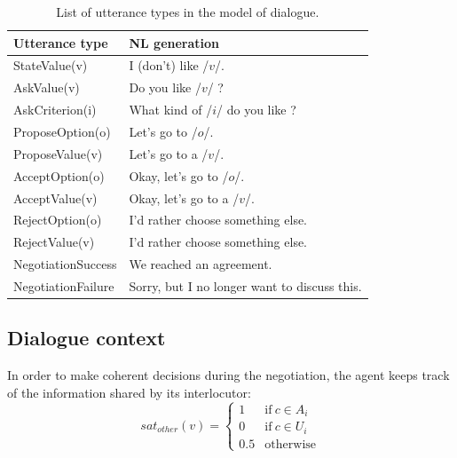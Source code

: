\documentclass[runningheads,a4paper]{llncs}
\begin{document}
	
	\begin{table}[t]
		{\scriptsize
			\begin{tabular} {|p{2.75cm}|p{4cm}|}
				\hline
				\textbf{Utterance type}  &\textbf{ NL generation} \\
				\hline
				StateValue(v) &  I (don't) like /$v$/. \\
				\hline
				AskValue(v)& Do you like /$v$/ ? \\
				
				AskCriterion(i) &  What kind of /$i$/ do you like ? \\
				\hline
				ProposeOption(o)  & Let's go to /$o$/.\\
				
				ProposeValue(v) & Let's go to a /$v$/.\\
				\hline
				AcceptOption(o)& Okay, let's go to /$o$/.\\
				
				AcceptValue(v) & Okay, let's go to a /$v$/.\\
				\hline
				RejectOption(o) & I'd rather choose  something else.\\
				
				RejectValue(v) &  I'd rather choose  something else.\\
				\hline
				NegotiationSuccess &  We reached an agreement.\\
				\cline{1-2}
				NegotiationFailure &  Sorry, but I no longer want to discuss this.\\
				\hline
			\end{tabular}
		}
		\caption{\label{table:utt}List of utterance types in the model of dialogue.}
	\end{table}
	
	
	\subsection{Dialogue context}
	In order to make coherent decisions during the negotiation, the agent keeps track of the information shared by its interlocutor:
		\vspace{-0.5em} 
		\begin{equation}
		sat_{other}(v)= \left\{\begin{array}{ll}
		1	 & \mathrm{if\ }  c \in A_i\\
		0    & \mathrm{if\ }c \in U_i\\
		0.5	 & \mathrm{otherwise}
		\end{array}\right.
		\end{equation}
	
\end{document}
